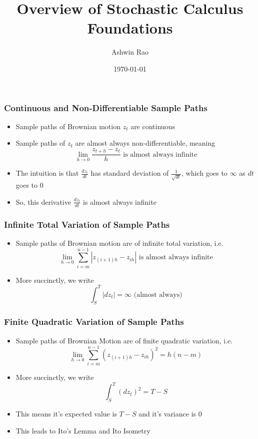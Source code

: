 \documentclass{beamer}
\title[Stochastic Calculus Foundations]{Overview of Stochastic Calculus Foundations} %
\author{Ashwin Rao} %
\institute[Stanford] %
{
ICME, Stanford University
}
\date{\today} %
\begin{document}
\begin{frame}
\titlepage %
\end{frame}

\begin{frame}
\frametitle{Continuous and Non-Differentiable Sample Paths}
\begin{itemize}
\item Sample paths of Brownian motion $z_t$ are continuous
\item Sample paths of $z_t$ are almost always non-differentiable, meaning
$$\lim_{h \rightarrow 0} \frac {z_{t+h} - z_t} {h} \mbox{ is almost always infinite}$$
\item The intuition is that $\frac {dz_t} {dt}$ has standard deviation of $\frac 1 {\sqrt{dt}}$, which goes to $\infty$ as $dt$ goes to 0
\item So, this derivative $\frac {dz_t} {dt}$ is almost always infinite
\end{itemize}
\end{frame}

\begin{frame}
\frametitle{Infinite Total Variation of Sample Paths}
\begin{itemize}
\item Sample paths of Brownian motion are of infinite total variation, i.e.
$$\lim_{h \rightarrow 0} \sum_{i=m}^{n-1} |z_{(i+1)h} - z_{ih}| \mbox{ is almost always infinite}$$
\item More succinctly, we write
$$\int_S^T |dz_t| = \infty \mbox{ (almost always)}$$
\end{itemize}
\end{frame}

\begin{frame}
\frametitle{Finite Quadratic Variation of Sample Paths}
\begin{itemize}
\item Sample paths of Brownian Motion are of finite quadratic variation, i.e.
$$\lim_{h \rightarrow 0} \sum_{i=m}^{n-1} (z_{(i+1)h} - z_{ih})^2 = h(n-m)$$ 
\item More succinctly, we write
$$\int_S^T (dz_t)^2= T-S$$
\item This means it's expected value is $T-S$ and it's variance is 0
\item This leads to Ito's Lemma and Ito Isometry
\end{itemize}
\end{frame}
\end{document}
